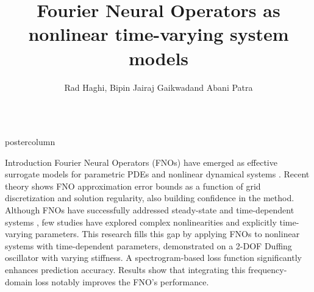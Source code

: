\documentclass[mathserif]{beamer}
\title{\huge Fourier Neural Operators as nonlinear
time-varying system models}
\author{Rad Haghi\footnotemark[1], Bipin Jairaj Gaikwad\footnotemark[1] and Abani Patra \footnotemark[1]{\bf include Babak?}}
\institute[Tufts University]{\footnotemark[1]Tufts Institute for Artificial Intelligence, Tufts University, Medford, MA 02155}
\newlength{\columnheight}
\begin{document}
\begin{frame}
	\begin{columns}

		\begin{beamercolorbox}[center,wd=\textwidth]{postercolumn}
			\begin{minipage}[T]{.95\linewidth}  %
			     \parbox[t][\columnheight]{\textwidth}{ %
			
					\begin{block}{Introduction}
Fourier Neural Operators (FNOs) have emerged as effective surrogate models for parametric PDEs and nonlinear dynamical systems \cite{kovachkiNeuralOperatorLearning2024,li2021}. %
Recent theory \cite{lantholer24} shows FNO approximation error bounds as a function of grid discretization and solution regularity, also building confidence in the method.
Although FNOs have successfully addressed steady-state and time-dependent systems \cite{kovachkiNeuralOperatorLearning2024,rahmanSparsifiedTimedependentFourier2024,iiModelParallelFourierNeural2023}, few studies have explored complex nonlinearities and explicitly time-varying parameters.  
This research fills this gap by applying FNOs to nonlinear systems with time-dependent parameters, demonstrated on a 2-DOF Duffing oscillator with varying stiffness. A spectrogram-based loss function \cite{chakraborty2025,cao2024} significantly enhances prediction accuracy. Results show that integrating this frequency-domain loss notably improves the FNO's performance.




\end{block}}
\end{minipage}
\end{beamercolorbox}
\end{columns}
\end{frame}
\end{document}
